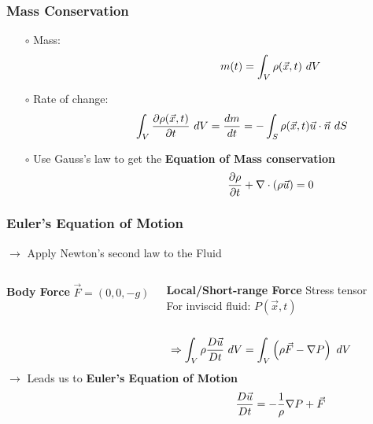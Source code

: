\documentclass[fleqn]{beamer}
\begin{document}
    \begin{frame}
        \frametitle{Mass Conservation}
        \begin{itemize}
            \item[$\circ$] Mass:
            \begin{align}
                \hspace{0.3\linewidth}
                m(t) = \int_V \rho(\vec{x}, t)\ dV \nonumber
            \end{align}
        \item[$\circ$] Rate of change:
            \begin{align}
                \hspace{0.15\linewidth}
                \int_V \frac{\partial \rho(\vec{x}, t)}{\partial t}\ dV = \frac{dm}{dt} =
                -\int_{S} \rho(\vec{x}, t) \vec{u}\cdot\vec{n}\ dS\nonumber
            \end{align}
        \item[$\circ$] Use Gauss's law to get the \textbf{Equation of Mass
            conservation}
            \begin{align}
                \hspace{0.3\linewidth} \frac{\partial \rho}{\partial t}
                +\nabla \cdot (\rho \vec{u}) =
                0 \nonumber
            \end{align}
        \end{itemize}
    \end{frame}

    \begin{frame}
        \frametitle{Euler's Equation of Motion}
        \centering
        $\rightarrow$ Apply Newton's second law to the Fluid
        \begin{columns}
            \begin{block}{\centering\textbf{Body Force}}
                \centering
                $\vec{F} = (0, 0, -g)$
            \end{block}
            \begin{block}{\centering\textbf{Local/Short-range Force}}
                \centering
                Stress tensor\\
                For inviscid fluid: $P(\vec{x},t)$
            \end{block}
        \end{columns}
        \begin{align}
            \hspace{0.3\linewidth}\Rightarrow\int_V \rho \frac{D\vec{u}}{Dt}\ dV =
            \int_V \left( \rho \vec{F} - \nabla P \right)\ dV\nonumber
        \end{align}
        \centering
        $\rightarrow$ Leads us to \textbf{Euler's Equation of Motion}
        \begin{align}
            \hspace{0.4\linewidth} \frac{D\vec{u}}{Dt} =-
            \frac{1}{\rho}\nabla P + \vec{F}  \nonumber
        \end{align}
    \end{frame}
\end{document}
